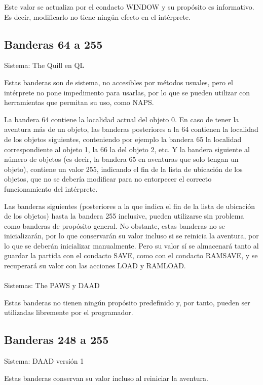 \documentclass[11pt, a5paper]{article}
\newcommand{\quill}{\textsf{The Quill}\xspace}
\newcommand{\paw}{\textsf{The PAWS}\xspace}
\newcommand{\daad}{\textsf{DAAD}\xspace}
\newcommand{\sistema}[1]{\noindent Sistema: #1 \nopagebreak}
\newcommand{\sistemas}[1]{\noindent Sistemas: #1 \nopagebreak}
\begin{document}
Este valor se actualiza por el condacto WINDOW y su propósito es informativo. Es decir, modificarlo no tiene ningún efecto en el intérprete.

\subsection{Banderas 64 a 255}

\sistema{\quill en QL}

Estas banderas son de sistema, no accesibles por métodos usuales, pero el intérprete no pone impedimento para usarlas, por lo que se pueden utilizar con herramientas que permitan su uso, como NAPS\cite{NAPS}.

La bandera 64 contiene la localidad actual del objeto 0. En caso de tener la aventura más de un objeto, las banderas posteriores a la 64 contienen la localidad de los objetos siguientes, conteniendo por ejemplo la bandera 65 la localidad correspondiente al objeto 1, la 66 la del objeto 2, etc. Y la bandera siguiente al número de objetos (es decir, la bandera 65 en aventuras que solo tengan un objeto), contiene un valor 255, indicando el fin de la lista de ubicación de los objetos, que no se debería modificar para no entorpecer el correcto funcionamiento del intérprete.

Las banderas siguientes (posteriores a la que indica el fin de la lista de ubicación de los objetos) hasta la bandera 255 inclusive, pueden utilizarse sin problema como banderas de propósito general. No obstante, estas banderas no se inicializarán, por lo que conservarán su valor incluso si se reinicia la aventura, por lo que se deberán inicializar manualmente. Pero su valor sí se almacenará tanto al guardar la partida con el condacto SAVE, como con el condacto RAMSAVE, y se recuperará su valor con las acciones LOAD y RAMLOAD.
\\\ \\
\sistemas{\paw y \daad}

Estas banderas no tienen ningún propósito predefinido y, por tanto, pueden ser utilizadas libremente por el programador.

\subsection{Banderas 248 a 255}

\sistema{\daad versión 1}

Estas banderas conservan su valor incluso al reiniciar la aventura.
\end{document}
